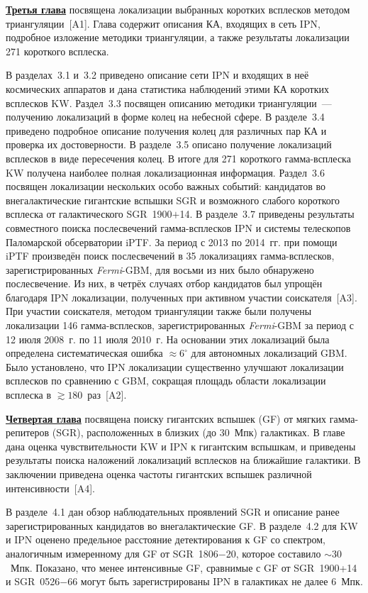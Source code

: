 \underline{\textbf{Третья глава}} посвящена локализации выбранных коротких всплесков 
методом триангуляции~[A1]. Глава содержит описания КА, входящих в сеть IPN, 
подробное изложение методики триангуляции, а также результаты локализации 
271 короткого всплеска.  

В разделах~3.1 и~3.2 приведено описание сети IPN и входящих в неё космических 
аппаратов и дана статистика наблюдений этими КА коротких всплесков KW. 
Раздел~3.3 посвящен описанию методики триангуляции~--- получению локализаций в 
форме колец на небесной сфере. В разделе~3.4 приведено подробное описание получения
колец для различных пар КА и проверка их достоверности. В разделе~3.5 описано
получение локализаций всплесков в виде пересечения колец. 
В итоге для 271 короткого гамма-всплеска KW получена наиболее полная локализационная информация. 
Раздел~3.6 посвящен 
локализации нескольких особо важных событий: кандидатов во внегалактические гигантские вспышки SGR 
и возможного слабого короткого всплеска от галактического SGR~1900$+$14.
В разделе~3.7 приведены результаты совместного поиска послесвечений гамма-всплесков IPN 
и системы телескопов Паломарской обсерватории iPTF. За период с 2013 по 2014~гг. 
при помощи iPTF произведён поиск послесвечений в 35 локализациях гамма-всплесков, 
зарегистрированных \textit{Fermi}-GBM, для восьми из них было обнаружено послесвечение. 
Из них, в четрёх случаях отбор кандидатов был упрощён благодаря IPN локализации, 
полученных при активном участии соискателя~[A3]. 
При участии соискателя, методом триангуляции также были получены локализации 146 гамма-всплесков,
зарегистрированных \textit{Fermi}-GBM за период с 12 июля 2008~г. по 11 июля 2010~г.
На основании этих локализаций была определена систематическая ошибка $\approx 6^\circ$
для автономных локализаций GBM. Было установлено, что IPN локализации 
существенно улучшают локализации всплесков по сравнению с GBM, сокращая площадь 
области локализации всплеска в $\gtrsim 180$~раз~[A2].  

\underline{\textbf{Четвертая глава}} посвящена поиску гигантских вспышек (GF) от мягких
гамма-репитеров (SGR), расположенных в близких (до 30~Мпк) галактиках.
В главе дана оценка чувствительности KW и IPN к гигантским вспышкам, 
и приведены результаты поиска наложений локализаций всплесков на ближайшие галактики. 
В заключении приведена оценка частоты гигантских вспышек различной 
интенсивности~[A4].

В разделе~4.1 дан обзор наблюдательных проявлений SGR и описание ранее зарегистрированных 
кандидатов во внегалактические GF. В разделе~4.2 для KW и IPN оценено предельное 
расстояние детектирования к GF со спектром, аналогичным измеренному для GF от SGR~1806$-$20, 
которое составило $\sim 30$~Мпк. Показано, что менее интенсивные GF, сравнимые 
с GF от SGR~1900+14 и SGR~0526$-$66 могут быть зарегистрированы IPN в галактиках 
не далее $6$~Мпк.


